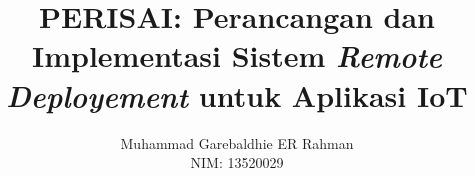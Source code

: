 \documentclass[bahasa, 12pt, a4paper, onecolumn, oneside, final]{report}
\begin{document}
\title{PERISAI: Perancangan dan Implementasi Sistem \textit{Remote Deployement} untuk Aplikasi IoT}
\date{}
\author{
  Muhammad Garebaldhie ER Rahman \\
  NIM: 13520029
}
\newcommand\tanggalpengesahan{7 Juli 2024}




% 

\pagestyle{plain}



% 







% 
% 
% 
% 
% 




% 
\end{document}
